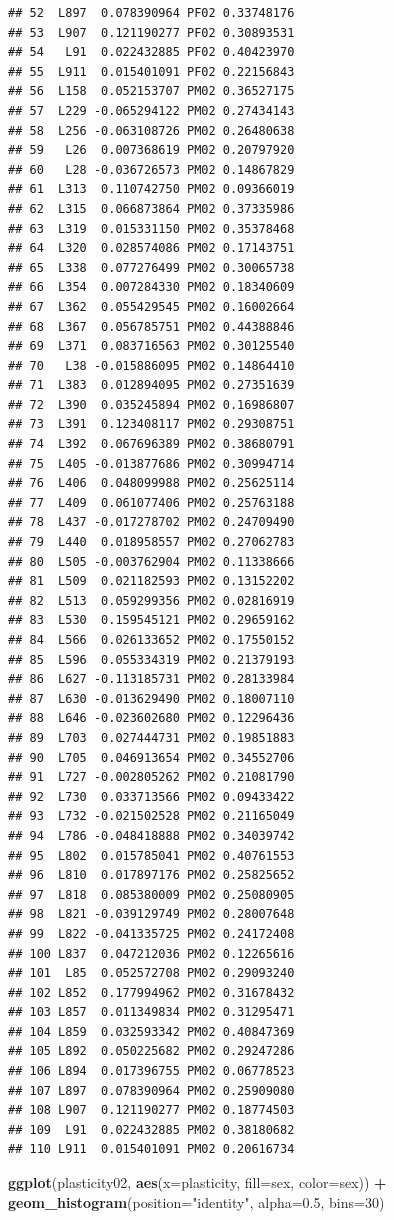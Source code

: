 \documentclass[
]{article}
\newenvironment{Shaded}{\begin{snugshade}}{\end{snugshade}}
\newcommand{\DataTypeTok}[1]{\textcolor[rgb]{0.13,0.29,0.53}{#1}}
\newcommand{\DecValTok}[1]{\textcolor[rgb]{0.00,0.00,0.81}{#1}}
\newcommand{\FloatTok}[1]{\textcolor[rgb]{0.00,0.00,0.81}{#1}}
\newcommand{\KeywordTok}[1]{\textcolor[rgb]{0.13,0.29,0.53}{\textbf{#1}}}
\newcommand{\NormalTok}[1]{#1}
\newcommand{\OperatorTok}[1]{\textcolor[rgb]{0.81,0.36,0.00}{\textbf{#1}}}
\newcommand{\StringTok}[1]{\textcolor[rgb]{0.31,0.60,0.02}{#1}}
\begin{document}
\begin{verbatim}
## 52  L897  0.078390964 PF02 0.33748176
## 53  L907  0.121190277 PF02 0.30893531
## 54   L91  0.022432885 PF02 0.40423970
## 55  L911  0.015401091 PF02 0.22156843
## 56  L158  0.052153707 PM02 0.36527175
## 57  L229 -0.065294122 PM02 0.27434143
## 58  L256 -0.063108726 PM02 0.26480638
## 59   L26  0.007368619 PM02 0.20797920
## 60   L28 -0.036726573 PM02 0.14867829
## 61  L313  0.110742750 PM02 0.09366019
## 62  L315  0.066873864 PM02 0.37335986
## 63  L319  0.015331150 PM02 0.35378468
## 64  L320  0.028574086 PM02 0.17143751
## 65  L338  0.077276499 PM02 0.30065738
## 66  L354  0.007284330 PM02 0.18340609
## 67  L362  0.055429545 PM02 0.16002664
## 68  L367  0.056785751 PM02 0.44388846
## 69  L371  0.083716563 PM02 0.30125540
## 70   L38 -0.015886095 PM02 0.14864410
## 71  L383  0.012894095 PM02 0.27351639
## 72  L390  0.035245894 PM02 0.16986807
## 73  L391  0.123408117 PM02 0.29308751
## 74  L392  0.067696389 PM02 0.38680791
## 75  L405 -0.013877686 PM02 0.30994714
## 76  L406  0.048099988 PM02 0.25625114
## 77  L409  0.061077406 PM02 0.25763188
## 78  L437 -0.017278702 PM02 0.24709490
## 79  L440  0.018958557 PM02 0.27062783
## 80  L505 -0.003762904 PM02 0.11338666
## 81  L509  0.021182593 PM02 0.13152202
## 82  L513  0.059299356 PM02 0.02816919
## 83  L530  0.159545121 PM02 0.29659162
## 84  L566  0.026133652 PM02 0.17550152
## 85  L596  0.055334319 PM02 0.21379193
## 86  L627 -0.113185731 PM02 0.28133984
## 87  L630 -0.013629490 PM02 0.18007110
## 88  L646 -0.023602680 PM02 0.12296436
## 89  L703  0.027444731 PM02 0.19851883
## 90  L705  0.046913654 PM02 0.34552706
## 91  L727 -0.002805262 PM02 0.21081790
## 92  L730  0.033713566 PM02 0.09433422
## 93  L732 -0.021502528 PM02 0.21165049
## 94  L786 -0.048418888 PM02 0.34039742
## 95  L802  0.015785041 PM02 0.40761553
## 96  L810  0.017897176 PM02 0.25825652
## 97  L818  0.085380009 PM02 0.25080905
## 98  L821 -0.039129749 PM02 0.28007648
## 99  L822 -0.041335725 PM02 0.24172408
## 100 L837  0.047212036 PM02 0.12265616
## 101  L85  0.052572708 PM02 0.29093240
## 102 L852  0.177994962 PM02 0.31678432
## 103 L857  0.011349834 PM02 0.31295471
## 104 L859  0.032593342 PM02 0.40847369
## 105 L892  0.050225682 PM02 0.29247286
## 106 L894  0.017396755 PM02 0.06778523
## 107 L897  0.078390964 PM02 0.25909080
## 108 L907  0.121190277 PM02 0.18774503
## 109  L91  0.022432885 PM02 0.38180682
## 110 L911  0.015401091 PM02 0.20616734
\end{verbatim}

\begin{Shaded}
\begin{Highlighting}[]
\KeywordTok{ggplot}\NormalTok{(plasticity02, }\KeywordTok{aes}\NormalTok{(}\DataTypeTok{x=}\NormalTok{plasticity, }\DataTypeTok{fill=}\NormalTok{sex, }\DataTypeTok{color=}\NormalTok{sex)) }\OperatorTok{+}
\StringTok{  }\KeywordTok{geom_histogram}\NormalTok{(}\DataTypeTok{position=}\StringTok{"identity"}\NormalTok{, }\DataTypeTok{alpha=}\FloatTok{0.5}\NormalTok{, }\DataTypeTok{bins=}\DecValTok{30}\NormalTok{)}
\end{Highlighting}
\end{Shaded}
\end{document}
